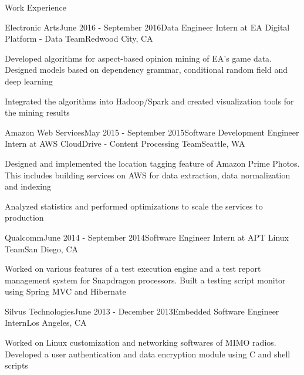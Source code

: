 \documentclass{resume} %
\begin{document}
\begin{rSection}{Work Experience}

\begin{rSubsection}{Electronic Arts}{June 2016 - September 2016}{Data Engineer Intern at EA Digital Platform - Data Team}{Redwood City, CA}
\item Developed algorithms for aspect-based opinion mining of EA's game data. Designed models based on dependency grammar, conditional random field and deep learning
\item Integrated the algorithms into Hadoop/Spark and created visualization tools for the mining results
\end{rSubsection}



\begin{rSubsection}{Amazon Web Services}{May 2015 - September 2015}{Software Development Engineer Intern at AWS CloudDrive - Content Processing Team}{Seattle, WA}
\item Designed and implemented the location tagging feature of Amazon Prime Photos. This includes building services on AWS for data extraction, data normalization and indexing
\item Analyzed statistics and performed optimizations to scale the services to production
\end{rSubsection}


\begin{rSubsection}{Qualcomm}{June 2014 - September 2014}{Software Engineer Intern at APT Linux Team}{San Diego, CA}
\item Worked on various features of a test execution engine and a test report management system for Snapdragon processors. Built a testing script monitor using Spring MVC and Hibernate
\end{rSubsection}


\begin{rSubsection}{Silvus Technologies}{June 2013 - December 2013}{Embedded Software Engineer Intern}{Los Angeles, CA}
\item Worked on Linux customization and networking softwares of MIMO radios. Developed a user authentication and data encryption module using C and shell scripts
\end{rSubsection}

\end{rSection}
\end{document}
